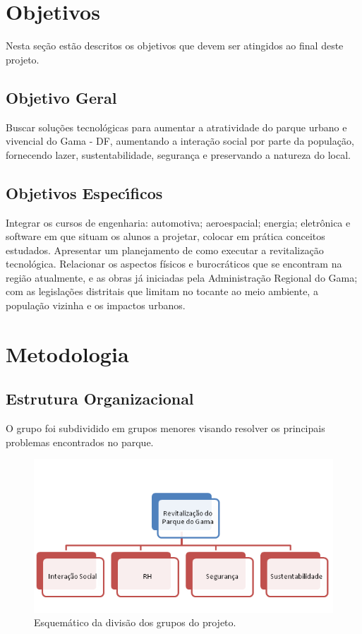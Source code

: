 \section{Objetivos}

Nesta se\c{c}\~ao est\~ao descritos os objetivos que devem ser atingidos ao final deste projeto.

\subsection{Objetivo Geral}

Buscar solu\c{c}\~oes tecnol\'ogicas para aumentar a atratividade do parque urbano e vivencial do Gama - DF, aumentando a intera\c{c}\~ao social por parte da popula\c{c}\~ao, fornecendo lazer, sustentabilidade, seguran\c{c}a e preservando a natureza do local. 

\subsection{Objetivos Espec\'{\i}ficos}

Integrar os cursos de engenharia: automotiva; aeroespacial; energia; eletr\^onica e software em que situam os alunos a projetar, colocar em pr\'atica conceitos estudados. 
Apresentar um planejamento de como executar a revitaliza\c{c}\~ao tecnol\'ogica. Relacionar os aspectos f\'isicos e burocr\'aticos que se encontram na regi\~ao atualmente, e as obras j\'a iniciadas pela Administra\c{c}\~ao Regional do Gama; com as legisla\c{c}\~oes distritais que limitam no tocante ao meio ambiente, a popula\c{c}\~ao vizinha e os impactos urbanos. 

\section{Metodologia}

\subsection{Estrutura Organizacional}

O grupo foi subdividido em grupos menores visando resolver os principais problemas encontrados no parque.

\begin{figure}[H]
	\centering
	\label{Estrutura Organizacional}
		\includegraphics[keepaspectratio=true,scale=1.0]{figuras/EstruturaOrganizacional.png}
	\caption{Esquem\'atico da divis\~ao dos grupos do projeto.}
\end{figure}

